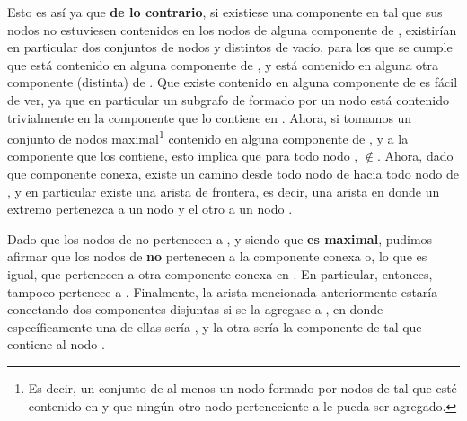 \documentclass[11pt, a4paper, twoside]{article}
\begin{document}
\begin{samepage}

\begin{demostracion}

Esto es así ya que \textbf{de lo contrario}, si existiese una componente
 en  tal que sus nodos no estuviesen
contenidos en los nodos de alguna componente de , existirían
en particular dos conjuntos de nodos  y
 distintos de vacío, para los que se
cumple que  está contenido en alguna componente de
, y  está contenido en alguna otra componente
(distinta) de . Que existe  contenido en
alguna componente de  es fácil de ver, ya que en particular un
subgrafo de  formado por un nodo está contenido trivialmente
en la componente que lo contiene en . Ahora, si tomamos
 un conjunto de nodos maximal\footnote{%
Es decir, un conjunto de al menos un nodo formado por nodos de 
tal que esté contenido en  y que ningún otro nodo perteneciente
a  le pueda ser agregado.} 
contenido en alguna componente de , y  a la
componente que los contiene, esto implica que para todo
nodo ,
$\notin$. Ahora, dado que  componente conexa, existe un camino desde todo nodo de
 hacia todo nodo de , y en particular existe
una arista de frontera, es decir, una arista 
en donde un extremo pertenezca a un nodo  y el otro
a un nodo . 

Dado que los nodos de 
no pertenecen a , y siendo que  \textbf{es
maximal}, pudimos afirmar que los nodos de  \textbf{no}
pertenecen a la componente conexa  o, lo que es igual, que
pertenecen a otra componente conexa en . En particular,
entonces,  tampoco pertenece a . Finalmente, 
la arista  mencionada anteriormente estaría conectando 
dos componentes disjuntas si se la agregase a , 
en donde específicamente una de ellas sería ,
y la otra sería la componente de  tal que contiene
al nodo .


\end{demostracion}
\end{samepage}
\end{document}
